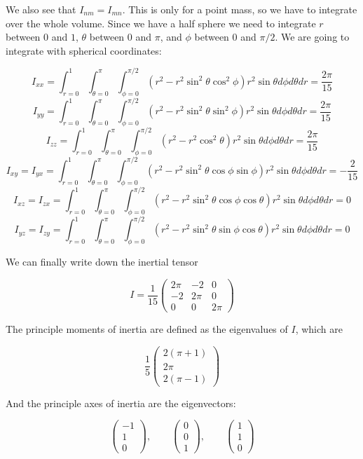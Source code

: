 \documentclass[a4paper,norsk, 10pt]{article}
\begin{document}
We also see that $I_{nm} = I_{mn}$. This is only for a point mass, so we have to integrate over the whole volume. Since we have a half sphere we need to integrate $r$ between $0$ and $1$, $\theta$ between $0$ and $\pi$, and $\phi$ between $0$ and $\pi/2$. We are going to integrate with spherical coordinates:

$$
I_{xx} = \int_{r = 0}^{1} \int_{\theta = 0}^{\pi} \int_{\phi = 0}^{\pi/2} (r^2 - r^2\sin^2\theta \cos^2\phi)r^2 \sin\theta d\phi d\theta dr = \frac{2\pi}{15}
$$
$$
I_{yy} = \int_{r = 0}^{1} \int_{\theta = 0}^{\pi} \int_{\phi = 0}^{\pi/2} (r^2 - r^2\sin^2\theta \sin^2\phi)r^2 \sin\theta d\phi d\theta dr = \frac{2\pi}{15}
$$
$$
I_{zz} = \int_{r = 0}^{1} \int_{\theta = 0}^{\pi} \int_{\phi = 0}^{\pi/2} (r^2 - r^2\cos^2\theta)r^2 \sin\theta d\phi d\theta dr = \frac{2\pi}{15}
$$
$$
I_{xy} = I_{yx} = \int_{r = 0}^{1} \int_{\theta = 0}^{\pi} \int_{\phi = 0}^{\pi/2} (r^2 - r^2\sin^2\theta \cos\phi\sin\phi)r^2 \sin\theta d\phi d\theta dr = -\frac{2}{15}
$$
$$
I_{xz} = I_{zx} = \int_{r = 0}^{1} \int_{\theta = 0}^{\pi} \int_{\phi = 0}^{\pi/2} (r^2 - r^2\sin^2\theta \cos\phi\cos\theta)r^2 \sin\theta d\phi d\theta dr = 0
$$
$$
I_{yz} = I_{zy} = \int_{r = 0}^{1} \int_{\theta = 0}^{\pi} \int_{\phi = 0}^{\pi/2} (r^2 - r^2\sin^2\theta \sin\phi\cos\theta)r^2 \sin\theta d\phi d\theta dr = 0
$$

We can finally write down the inertial tensor

$$
I = \frac{1}{15}
\begin{pmatrix}
2\pi & -2 & 0\\
-2 & 2\pi & 0\\
0&0& 2\pi
\end{pmatrix}
$$

The principle moments of inertia are defined as the eigenvalues of $I$, which are

$$
\frac{1}{5}
\begin{pmatrix}
2(\pi + 1) \\
2\pi \\
2(\pi -1)
\end{pmatrix}
$$

And the principle axes of inertia are the eigenvectors:

$$
\begin{pmatrix}
-1\\
1\\
0
\end{pmatrix}
,\qquad
\begin{pmatrix}
0\\
0\\
1
\end{pmatrix}
,\qquad
\begin{pmatrix}
1\\
1\\
0
\end{pmatrix}
$$
\end{document}
